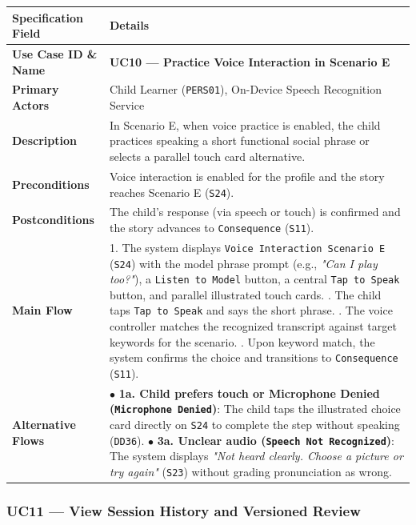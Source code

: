 \noindent\begin{xltabular}{\textwidth}{|p{4.0cm}|X|}
\hline
\textbf{Specification Field} & \textbf{Details} \\ \hline
\endhead
\textbf{Use Case ID \& Name} & \textbf{UC10 — Practice Voice Interaction in Scenario E} \\ \hline
\textbf{Primary Actors} & Child Learner (\texttt{PERS01}), On-Device Speech Recognition Service \\ \hline
\textbf{Description} & In Scenario E, when voice practice is enabled, the child practices speaking a short functional social phrase or selects a parallel touch card alternative. \\ \hline
\textbf{Preconditions} & Voice interaction is enabled for the profile and the story reaches Scenario E (\texttt{S24}). \\ \hline
\textbf{Postconditions} & The child's response (via speech or touch) is confirmed and the story advances to \texttt{Consequence} (\texttt{S11}). \\ \hline
\textbf{Main Flow} & 1. The system displays \texttt{Voice Interaction Scenario E} (\texttt{S24}) with the model phrase prompt (e.g., \textit{"Can I play too?"}), a \texttt{Listen to Model} button, a central \texttt{Tap to Speak} button, and parallel illustrated touch cards. . The child taps \texttt{Tap to Speak} and says the short phrase. . The voice controller matches the recognized transcript against target keywords for the scenario. . Upon keyword match, the system confirms the choice and transitions to \texttt{Consequence} (\texttt{S11}). \\ \hline
\textbf{Alternative Flows} & $\bullet$ \textbf{1a. Child prefers touch or Microphone Denied (\texttt{Microphone Denied})}: The child taps the illustrated choice card directly on \texttt{S24} to complete the step without speaking (\texttt{DD36}). \newline $\bullet$ \textbf{3a. Unclear audio (\texttt{Speech Not Recognized})}: The system displays \textit{"Not heard clearly. Choose a picture or try again"} (\texttt{S23}) without grading pronunciation as wrong. \\ \hline
\end{xltabular}



\subsubsection{UC11 — View Session History and Versioned Review}


